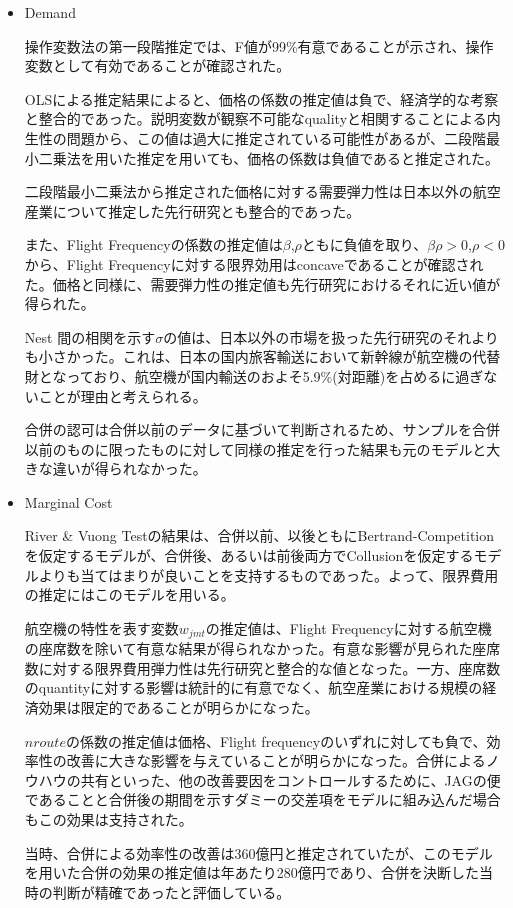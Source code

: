 \documentclass{jsarticle}
\begin{document}
\begin{enumerate}
\begin{itemize}
 \item Demand
 
 操作変数法の第一段階推定では、F値が99\%有意であることが示され、操作変数として有効であることが確認された。
 
 OLSによる推定結果によると、価格の係数の推定値は負で、経済学的な考察と整合的であった。説明変数が観察不可能なqualityと相関することによる内生性の問題から、この値は過大に推定されている可能性があるが、二段階最小二乗法を用いた推定を用いても、価格の係数は負値であると推定された。
 
 二段階最小二乗法から推定された価格に対する需要弾力性は日本以外の航空産業について推定した先行研究とも整合的であった。
 
 また、Flight Frequencyの係数の推定値は$\beta$,$\rho$ともに負値を取り、$\beta \rho >0$,$\rho<0$から、Flight Frequencyに対する限界効用はconcaveであることが確認された。価格と同様に、需要弾力性の推定値も先行研究におけるそれに近い値が得られた。
 
 Nest 間の相関を示す$\sigma$の値は、日本以外の市場を扱った先行研究のそれよりも小さかった。これは、日本の国内旅客輸送において新幹線が航空機の代替財となっており、航空機が国内輸送のおよそ5.9\%(対距離)を占めるに過ぎないことが理由と考えられる。
 
 合併の認可は合併以前のデータに基づいて判断されるため、サンプルを合併以前のものに限ったものに対して同様の推定を行った結果も元のモデルと大きな違いが得られなかった。
 
 \item Marginal Cost
 
 River \& Vuong Testの結果は、合併以前、以後ともにBertrand-Competitionを仮定するモデルが、合併後、あるいは前後両方でCollusionを仮定するモデルよりも当てはまりが良いことを支持するものであった。よって、限界費用の推定にはこのモデルを用いる。
 
 航空機の特性を表す変数$w_{jmt}$の推定値は、Flight Frequencyに対する航空機の座席数を除いて有意な結果が得られなかった。有意な影響が見られた座席数に対する限界費用弾力性は先行研究と整合的な値となった。一方、座席数のquantityに対する影響は統計的に有意でなく、航空産業における規模の経済効果は限定的であることが明らかになった。
 
 $nroute$の係数の推定値は価格、Flight frequencyのいずれに対しても負で、効率性の改善に大きな影響を与えていることが明らかになった。合併によるノウハウの共有といった、他の改善要因をコントロールするために、JAGの便であることと合併後の期間を示すダミーの交差項をモデルに組み込んだ場合もこの効果は支持された。
 
 当時、合併による効率性の改善は360億円と推定されていたが、このモデルを用いた合併の効果の推定値は年あたり280億円であり、合併を決断した当時の判断が精確であったと評価している。


\end{itemize}
\end{enumerate}
\end{document}
